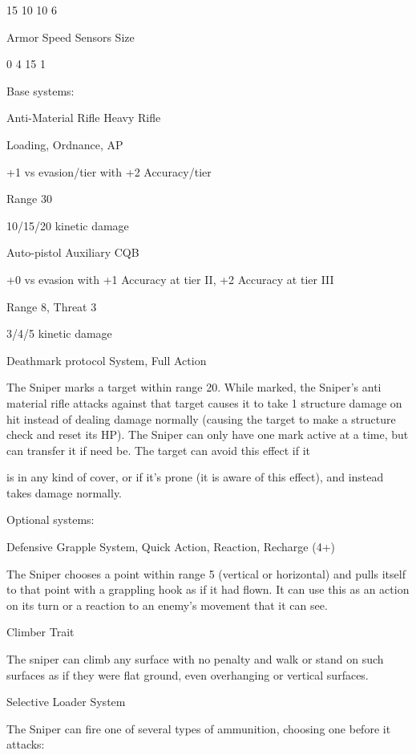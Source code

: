  15         10           10            6 

 Armor      Speed        Sensors       Size 

 0          4            15            1 

Base systems:
 
Anti-Material Rifle  
Heavy Rifle
 
Loading, Ordnance, AP
 
+1 vs evasion/tier with +2 Accuracy/tier
 
Range 30
 
10/15/20 kinetic damage
 

Auto-pistol  
Auxiliary CQB
 
+0 vs evasion with +1 Accuracy at tier II, +2 Accuracy at tier III
 
Range 8, Threat 3
 
3/4/5 kinetic damage
 

Deathmark protocol  
System, Full Action
 
The Sniper marks a target within range 20. While marked, the Sniper’s anti material rifle attacks  
against that target causes it to take 1 structure damage on hit instead of dealing damage  
normally (causing the target to make a structure check and reset its HP). The Sniper can only  
have one mark active at a time, but can transfer it if need be. The target can avoid this effect if it  

                                                                                                          


is in any kind of cover, or if it’s prone (it is aware of this effect), and instead takes damage  
normally.
 

Optional systems:
 
Defensive Grapple  
System, Quick Action, Reaction, Recharge (4+)
 
The Sniper chooses a point within range 5 (vertical or horizontal) and pulls itself to that point with  
a grappling hook as if it had flown. It can use this as an action on its turn or a reaction to an  
enemy’s movement that it can see.
 

Climber  
Trait
 
The sniper can climb any surface with no penalty and walk or stand on such surfaces as if they  
were flat ground, even overhanging or vertical surfaces. 
 

Selective Loader  
System
 
The Sniper can fire one of several types of ammunition, choosing one before it attacks:
 
